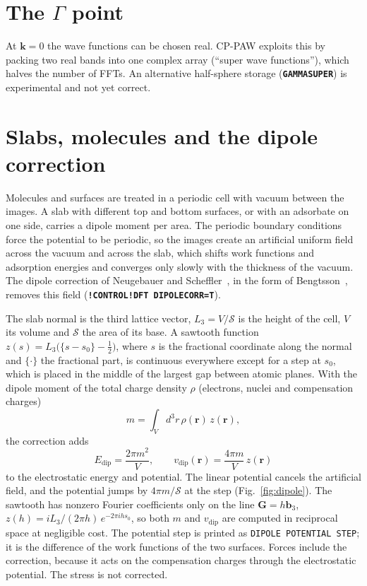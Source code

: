 \documentclass[11pt,a4paper,oneside]{book}
\newcommand{\key}[1]{\textbf{\texttt{#1}}}
\begin{document}
\section{The $\Gamma$ point}\label{sec:gamma}

At $\bm k=0$ the wave functions can be chosen real. CP-PAW exploits this
by packing two real bands into one complex array (``super wave
functions''), which halves the number of FFTs. An alternative half-sphere
storage (\key{GAMMASUPER}) is experimental and not yet correct.

\section{Slabs, molecules and the dipole correction}\label{sec:dipole}

Molecules and surfaces are treated in a periodic cell with vacuum
between the images. A slab with different top and bottom surfaces, or with
an adsorbate on one side, carries a dipole moment per area. The periodic
boundary conditions force the potential to be periodic, so the images
create an artificial uniform field across the vacuum and across the slab,
which shifts work functions and adsorption energies and converges only
slowly with the thickness of the vacuum. The dipole correction of
Neugebauer and Scheffler~\cite{neugebauer92_prb46_16067}, in the form of
Bengtsson~\cite{bengtsson99_prb59_12301}, removes this field
(\key{!CONTROL!DFT DIPOLECORR=T}).

The slab normal is the third lattice vector, $L_3=V/\mathcal S$ is the height
of the cell, $V$ its volume and $\mathcal S$ the area of its base. A sawtooth function
$z(s)=L_3\bigl(\{s-s_0\}-\frac12\bigr)$, where $s$ is the fractional
coordinate along the normal and $\{\cdot\}$ the fractional part, is
continuous everywhere except for a step at $s_0$, which is placed in the
middle of the largest gap between atomic planes. With the dipole moment of
the total charge density $\rho$ (electrons, nuclei and compensation
charges)
\begin{equation}
  m=\int_V d^3r\,\rho(\bm r)\,z(\bm r),
\end{equation}
the correction adds
\begin{equation}
  E_{\mathrm{dip}}=\frac{2\pi m^2}{V},\qquad
  v_{\mathrm{dip}}(\bm r)=\frac{4\pi m}{V}\,z(\bm r)
  \label{eq:dipole}
\end{equation}
to the electrostatic energy and potential. The linear potential cancels
the artificial field, and the potential jumps by $4\pi m/\mathcal S$ at the step
(Fig.~\ref{fig:dipole}). The sawtooth has nonzero Fourier coefficients
only on the line $\bm G=h\bm b_3$, $z(h)=iL_3/(2\pi h)\,e^{-2\pi ihs_0}$,
so both $m$ and $v_{\mathrm{dip}}$ are computed in reciprocal space at
negligible cost. The potential step is printed as
\texttt{DIPOLE POTENTIAL STEP}; it is the difference of the work
functions of the two surfaces. Forces include the correction, because it
acts on the compensation charges through the electrostatic potential.
The stress is not corrected.
\end{document}
